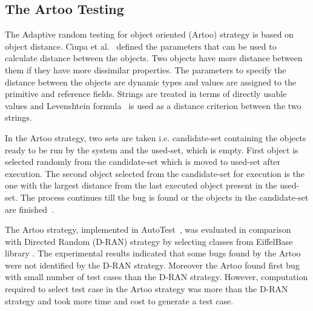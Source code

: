 \subsection{The Artoo Testing}
The Adaptive random testing for object oriented (Artoo) strategy is based on object distance. Ciupa et al.~\cite{ciupa2006object} defined the parameters that can be used to calculate distance between the objects. Two objects have more distance between them if they have more dissimilar properties. The parameters to specify the distance between the objects are dynamic types and values are assigned to the primitive and reference fields. Strings are treated in terms of directly usable values and Levenshtein formula~\cite{levenshtein1966binary} is used as a distance criterion between the two strings.

In the Artoo strategy, two sets are taken i.e. candidate-set containing the objects ready to be run by the system and the used-set, which is empty. First object is selected randomly from the candidate-set which is moved to used-set after execution. The second object selected from the candidate-set for execution is the one with the largest distance from the last executed object present in the used-set. The process continues till the bug is found or the objects in the candidate-set are finished~\cite{ciupa2006object}.

The Artoo strategy, implemented in AutoTest~\cite{ciupa2008artoo}, was evaluated in comparison with Directed Random (D-RAN) strategy by selecting classes from EiffelBase library \cite{meyer1987eiffel}. The experimental results indicated that some bugs found by the Artoo were not identified by the D-RAN strategy. Moreover the Artoo found first bug with small number of test cases than the D-RAN strategy. However, computation required to select test case in the Artoo strategy was more than the D-RAN strategy and took more time and cost to generate a test case.

